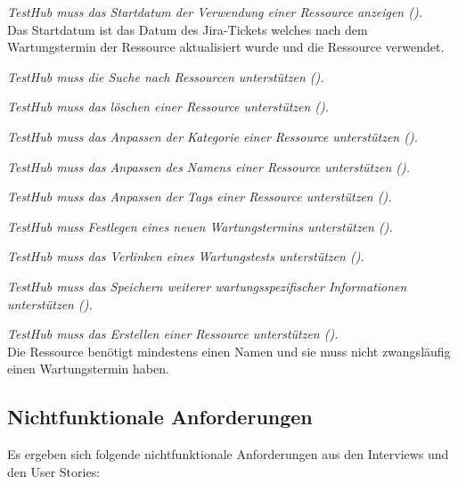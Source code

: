 \begin{description}
    \textit{TestHub muss das Startdatum der Verwendung einer Ressource anzeigen ().}\\
    Das Startdatum ist das Datum des Jira-Tickets welches nach dem Wartungstermin 
    der Ressource aktualisiert wurde und die Ressource verwendet.

    \textit{TestHub muss die Suche nach Ressourcen unterstützen ().}
    
    \textit{TestHub muss das löschen einer Ressource unterstützen ().}
       
    \textit{TestHub muss das Anpassen der Kategorie einer Ressource unterstützen 
    ().}

    \textit{TestHub muss das Anpassen des Namens einer Ressource unterstützen 
    ().}

    \textit{TestHub muss das Anpassen der Tags einer Ressource unterstützen 
    ().}

    \textit{TestHub muss Festlegen eines neuen Wartungstermins unterstützen 
    ().}

    \textit{TestHub muss das Verlinken eines Wartungstests unterstützen 
    ().}

    \textit{TestHub muss das Speichern weiterer wartungsspezifischer Informationen unterstützen 
    ().}

    \textit{TestHub muss das Erstellen einer Ressource unterstützen 
    ().}\\
    Die Ressource benötigt mindestens einen Namen und sie muss nicht zwangsläufig 
    einen Wartungstermin haben.

\end{description}

\subsection{Nichtfunktionale Anforderungen}
Es ergeben sich folgende nichtfunktionale Anforderungen aus den Interviews und 
den User Stories:

